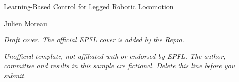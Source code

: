 \begin{titlepage}
\centering
\vspace*{2in}
{\LARGE Learning-Based Control for Legged Robotic Locomotion\par}
\vspace{0.5in}
{\large Julien Moreau\par}
\vspace{0.8in}
{\itshape Draft cover. The official EPFL cover is added by the Repro.}\par
\vfill
{\footnotesize\itshape Unofficial template, not affiliated with or endorsed by EPFL. The author, committee and results in this sample are fictional. Delete this line before you submit.}
\end{titlepage}
